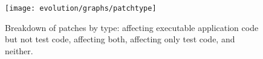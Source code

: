 
\begin{figure}[t]
\centering
\texttt{[image: evolution/graphs/patchtype]}
\caption{Breakdown of patches by type: affecting executable application code but not test code, affecting both, affecting only test code, and neither.}
\label{fig:patch-types}
\end{figure}

